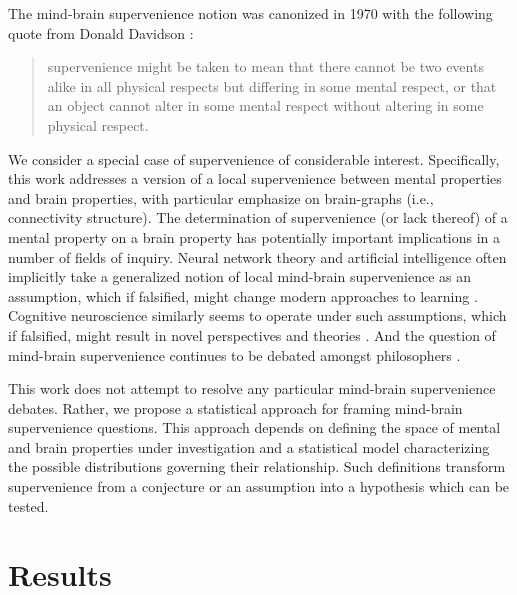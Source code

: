 \documentclass{article}
\begin{document}

\newpage

\noindent The mind-brain supervenience notion was canonized in 1970 with the following quote from Donald Davidson \cite{Davidson70}:
\begin{quotation}
 supervenience might be taken to mean that there cannot be two events alike in all physical respects but differing in some mental respect, or that an object cannot alter in some mental respect without altering in some physical respect.
\end{quotation}
We consider a special case of supervenience of considerable interest.  Specifically, this work addresses a version of a local supervenience between mental properties and brain properties, with particular emphasize on brain-graphs (i.e., connectivity structure).  The determination of supervenience (or lack thereof) of a mental property on a brain property has potentially important implications in a number of fields of inquiry.  Neural network theory and artificial intelligence often implicitly take a generalized notion of local mind-brain supervenience as an assumption, which if falsified, might change modern approaches to learning \cite{Haykin2008,Ripley2008}. Cognitive neuroscience similarly seems to operate under such assumptions, which if falsified, might result in novel perspectives and theories \cite{Fodor1998, Gazzaniga2008}.  And the question of mind-brain supervenience continues to be debated amongst philosophers \cite{Kim2007}.

This work does not attempt to resolve any particular mind-brain supervenience debates.  Rather, we propose a statistical approach for framing mind-brain supervenience questions.  This approach depends on defining the space of mental and brain properties under investigation and a statistical model characterizing the possible distributions governing their relationship.  Such definitions transform supervenience from a conjecture or an assumption into a hypothesis which can be tested.



\section*{Results}
\end{document}

